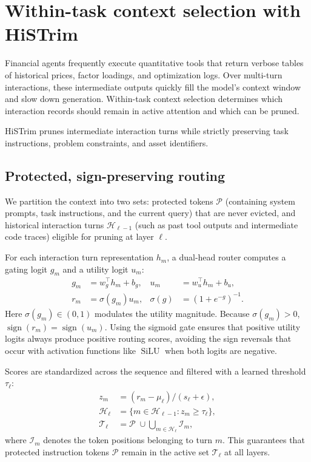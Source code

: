 \section{Within-task context selection with HiSTrim}
\label{sec:histrim}
Financial agents frequently execute quantitative tools that return verbose tables of
historical prices, factor loadings, and optimization logs. Over multi-turn interactions,
these intermediate outputs quickly fill the model's context window and slow down
generation. Within-task context selection determines which interaction records should
remain in active attention and which can be pruned.

HiSTrim prunes intermediate interaction turns while strictly preserving task
instructions, problem constraints, and asset identifiers.

\subsection{Protected, sign-preserving routing}
We partition the context into two sets: protected tokens $\mathcal{P}$ (containing system
prompts, task instructions, and the current query) that are never evicted, and historical
interaction turns $\mathcal{H}_{\ell-1}$ (such as past tool outputs and intermediate code
traces) eligible for pruning at layer $\ell$.

For each interaction turn representation $h_m$, a dual-head router computes a gating logit
$g_m$ and a utility logit $u_m$:
\begin{align}
 g_m &= w_g^\top h_m+b_g, & u_m &= w_u^\top h_m+b_u,\\
 r_m &= \sigma(g_m)u_m, & \sigma(g)&=(1+e^{-g})^{-1}.
\end{align}
Here $\sigma(g_m)\in(0,1)$ modulates the utility magnitude. Because $\sigma(g_m)>0$,
$\operatorname{sign}(r_m)=\operatorname{sign}(u_m)$. Using the sigmoid gate ensures that
positive utility logits always produce positive routing scores, avoiding the sign
reversals that occur with activation functions like $\operatorname{SiLU}$ when both
logits are negative.

Scores are standardized across the sequence and filtered with a learned threshold $\tau_\ell$:
\begin{align}
 z_m &= (r_m-\mu_\ell)/(s_\ell+\epsilon),\\
 \mathcal{H}_\ell &= \{m\in\mathcal{H}_{\ell-1}:z_m\ge\tau_\ell\},\\
 \mathcal{T}_\ell &= \mathcal{P}\;\cup\!\bigcup_{m\in\mathcal{H}_\ell}\mathcal{I}_m,
\end{align}
where $\mathcal{I}_m$ denotes the token positions belonging to turn $m$. This guarantees
that protected instruction tokens $\mathcal{P}$ remain in the active set $\mathcal{T}_\ell$
at all layers.

